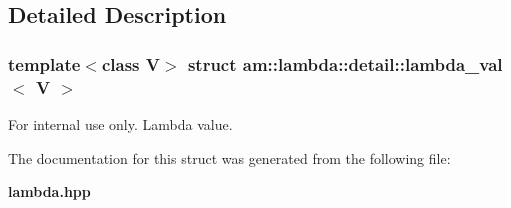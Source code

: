 \subsection{Detailed Description}
\subsubsection*{template$<$class V$>$ struct am::lambda::detail::lambda\_\-val$<$ V $>$}

\begin{Desc}
\item[For internal use only.]
Lambda value. \end{Desc}




The documentation for this struct was generated from the following file:\begin{CompactItemize}
\item 
{\bf lambda.hpp}\end{CompactItemize}

